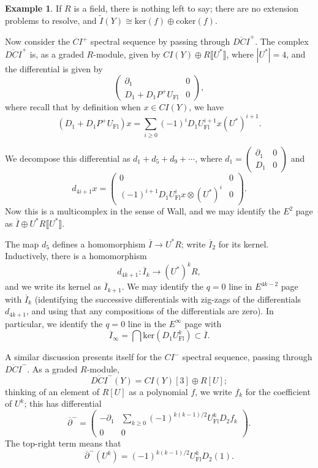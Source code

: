 \documentclass{memo-l}
\theoremstyle{definition}
\newtheorem{example}[theorem]{Example}
\theoremstyle{remark}
\numberwithin{section}{chapter}
\numberwithin{equation}{chapter}
\begin{document}
\begin{example}
If $R$ is a field, there is nothing left to say; there are no extension problems to resolve, and $\widetilde I(Y) \cong \text{ker}(f) \oplus \text{coker}(f)$.

Now consider the $CI^+$ spectral sequence by passing through $\overline{DCI}^+$. The complex $\overline{DCI}^+$ is, as a graded $R$-module, given by $CI(Y) \oplus R\llbracket U^*\rrbracket$, where $|U^*| = 4$, and the differential is given by 
$$\begin{pmatrix}\partial_1 & 0 \\ D_1 + D_1P^+U_\text{Fl} & 0\end{pmatrix},$$ 
where recall that by definition when $x \in CI(Y)$, we have $$(D_1 + D_1 P^+U_{\text{Fl}})x = \sum_{i \geq 0} (-1)^i D_1 U_{\text{Fl}}^{i+1} x (U^*)^{i+1}.$$

We decompose this differential as $d_1 + d_5 + d_9 + \cdots$, where $d_1 = \begin{pmatrix}\partial_1 & 0\\ D_1 & 0\end{pmatrix}$ and
$$d_{4i+1}x = \begin{pmatrix}0 & 0\\ (-1)^{i+1} D_1 U_{\text{Fl}}^ix \otimes (U^*)^i & 0 \end{pmatrix}.$$
Now this is a multicomplex in the sense of Wall, and we may identify the $E^2$ page as $\overline{I} \oplus U^*R\llbracket U^*\rrbracket$.

The map $d_5$ defines a homomorphism $\overline{I} \to U^*R$; write $\overline{I}_2$ for its kernel. Inductively, there is a homomorphism $$d_{4k+1}: \overline I_k \to (U^*)^k R,$$ and we write its kernel as $\overline I_{k+1}$. We may identify the $q = 0$ line in $E^{4k-2}$ page with $\overline I_{k}$ (identifying the successive differentials with zig-zags of the differentials $d_{4k+1}$, and using that any compositions of the differentials are zero). In particular, we identify the $q=0$ line in the $E^\infty$ page with $$\overline I_\infty = \bigcap \text{ker}(D_1U_{\text{Fl}}^k) \subset \overline I.$$

A similar discussion presents itself for the $CI^-$ spectral sequence, passing through $\overline{DCI}^-$. As a graded $R$-module, $$\overline{DCI}^-(Y) = CI(Y)[3] \oplus R[U];$$ thinking of an element of $R[U]$ as a polynomial $f$, we write $f_k$ for the coefficient of $U^k$; this has differential 
$$\overline{\partial}^- = \begin{pmatrix}-\partial_1 & \sum_{k \geq 0} (-1)^{k(k-1)/2} U_{\text{Fl}}^k D_2 f_k \\0 & 0\end{pmatrix}.$$ 
The top-right term means that $$\overline{\partial}^-(U^k) = (-1)^{k(k-1)/2} U_{\text{Fl}}^k D_2(1).$$


\end{example}
\end{document}
